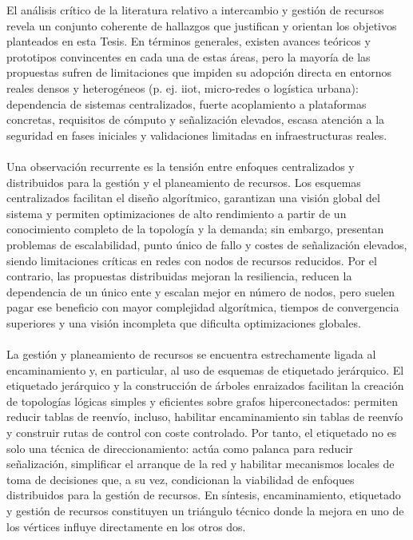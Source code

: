 El análisis crítico de la literatura relativo a intercambio y gestión de recursos revela un conjunto coherente de hallazgos que justifican y orientan los objetivos planteados en esta Tesis. En términos generales, existen avances teóricos y prototipos convincentes en cada una de estas áreas, pero la mayoría de las propuestas sufren de limitaciones que impiden su adopción directa en entornos reales densos y heterogéneos (p. ej. \gls{iiot}, micro-redes o logística urbana): dependencia de sistemas centralizados, fuerte acoplamiento a plataformas concretas, requisitos de cómputo y señalización elevados, escasa atención a la seguridad en fases iniciales y validaciones limitadas en infraestructuras reales.\\
\\
Una observación recurrente es la tensión entre enfoques centralizados y distribuidos para la gestión y el planeamiento de recursos. Los esquemas centralizados facilitan el diseño algorítmico, garantizan una visión global del sistema y permiten optimizaciones de alto rendimiento a partir de un conocimiento completo de la topología y la demanda; sin embargo, presentan problemas de escalabilidad, punto único de fallo y costes de señalización elevados, siendo limitaciones críticas en redes con nodos de recursos reducidos. Por el contrario, las propuestas distribuidas mejoran la resiliencia, reducen la dependencia de un único ente y escalan mejor en número de nodos, pero suelen pagar ese beneficio con mayor complejidad algorítmica, tiempos de convergencia superiores y una visión incompleta que dificulta optimizaciones globales.\\
\\
La gestión y planeamiento de recursos se encuentra estrechamente ligada al encaminamiento y, en particular, al uso de esquemas de etiquetado jerárquico. El etiquetado jerárquico y la construcción de árboles enraizados facilitan la creación de topologías lógicas simples y eficientes sobre grafos hiperconectados: permiten reducir tablas de reenvío, incluso, habilitar encaminamiento sin tablas de reenvío y construir rutas de control con coste controlado. Por tanto, el etiquetado no es solo una técnica de direccionamiento: actúa como palanca para reducir señalización, simplificar el arranque de la red  y habilitar mecanismos locales de toma de decisiones que, a su vez, condicionan la viabilidad de enfoques distribuidos para la gestión de recursos. En síntesis, encaminamiento, etiquetado y gestión de recursos constituyen un triángulo técnico donde la mejora en uno de los vértices influye directamente en los otros dos.\\
